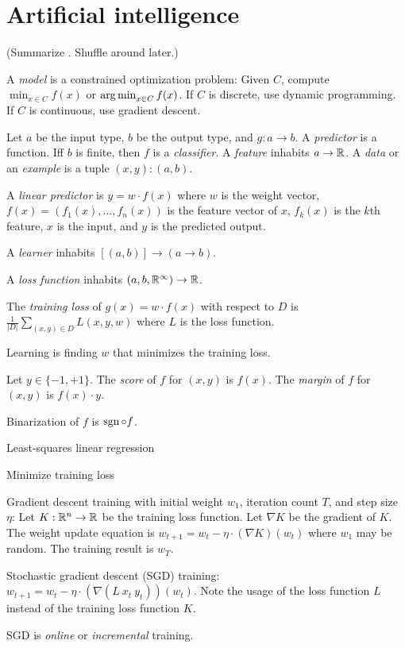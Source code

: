 \chapter{Artificial intelligence}

(Summarize \cite{LiangCs221}. Shuffle around later.)

A
%
\emph{model} is a constrained optimization problem:
Given \(C\),
compute \(\min_{x \in C} f(x)\) or \(\operatorname{arg\,min}_{x \in C} f(x)\).
If \(C\) is discrete, use dynamic programming.
If \(C\) is continuous, use gradient descent.

Let \(a\) be the input type, \(b\) be the output type, and \(g : a \to b\).
A
%
\emph{predictor} is a function.
Iff \(b\) is finite, then \(f\) is a
%
\emph{classifier}.
A
%
\emph{feature} inhabits \(a \to \mathbb{R}\).
A
%
\emph{data} or an
%
\emph{example}
is a tuple \((x,y) : (a,b)\).

A
%
%
\emph{linear predictor} is \(y = w \cdot f(x)\) where \(w\) is the weight vector,
\(f(x) = (f_1(x),\ldots,f_n(x))\) is the feature vector of \(x\),
\(f_k(x)\) is the \(k\)th feature,
\(x\) is the input,
and \(y\) is the predicted output.

A
%
\emph{learner} inhabits \([(a,b)] \to (a \to b)\).

A
%
\emph{loss function} inhabits \((a,b,\mathbb{R}^\infty) \to \mathbb{R}\).

The
%
\emph{training loss} of \(g(x) = w \cdot f(x)\) with respect to \(D\)
is \(\frac{1}{|D|} \sum_{(x,y) \in D} L(x,y,w)\)
where \(L\) is the loss function.

Learning is finding \(w\) that minimizes the training loss.

Let \(y \in \{-1,+1\}\).
The
%
\emph{score} of \(f\) for \((x,y)\) is \(f(x)\).
The
%
\emph{margin} of \(f\) for \((x,y)\) is \(f(x) \cdot y\).

Binarization of \(f\) is \(\operatorname{sgn} \circ f\).

Least-squares linear regression

Minimize training loss

Gradient descent training with initial weight \(w_1\), iteration count \(T\), and step size \(\eta\):
Let \(K : \mathbb{R}^n \to \mathbb{R}\) be the training loss function.
Let \(\nabla K\) be the gradient of \(K\).
The weight update equation is \(w_{t+1} = w_t - \eta \cdot (\nabla K)(w_t)\)
where \(w_1\) may be random.
The training result is \(w_T\).

Stochastic gradient descent (SGD) training:
\(w_{t+1} = w_t - \eta \cdot (\nabla(L~x_t~y_t))(w_t)\).
Note the usage of the loss function \(L\)
instead of the training loss function \(K\).

SGD is \emph{online} or \emph{incremental} training.
